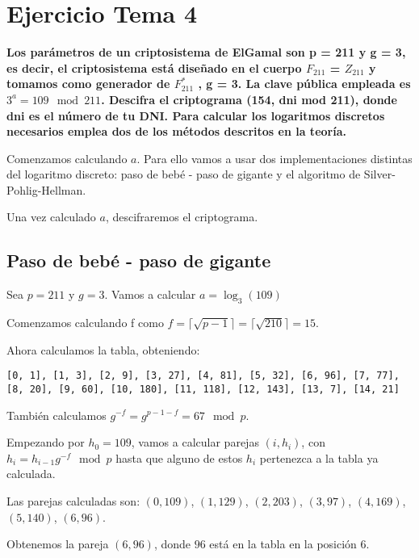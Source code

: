 \documentclass[a4paper]{article}
\title {\fbox{\Huge{\textbf{Ejercicio Tema 4}}}}
\author {\fbox{Ana Buendía Ruiz-Azuaga}}
\begin{document}
\maketitle


\section{Ejercicio Tema 4}

\textbf{Los parámetros de un criptosistema de ElGamal son p = 211 y g = 3, es decir, el criptosistema está diseñado en el cuerpo $F_{211}$ = $Z_{211}$ y tomamos como generador de $F^*_{211}$ , g = 3. La clave pública empleada es $3^a = 109 \mod 211$. Descifra el criptograma (154, dni mod 211), donde dni es el número de tu DNI. Para calcular los logaritmos discretos necesarios emplea dos de los métodos descritos en la teoría.}

Comenzamos calculando $a$. Para ello vamos a usar dos implementaciones distintas del logaritmo discreto: paso de bebé - paso de gigante y el algoritmo de Silver-Pohlig-Hellman.

Una vez calculado $a$, descifraremos el criptograma.

\subsection{Paso de bebé - paso de gigante}

Sea $p=211$ y $g=3$. Vamos a calcular $a=\log_3 (109)$

Comenzamos calculando f como $f=\lceil\sqrt{p-1}\rceil=\lceil\sqrt{210}\rceil=15$.

Ahora calculamos la tabla, obteniendo:

\begin{verbatim}
[0, 1], [1, 3], [2, 9], [3, 27], [4, 81], [5, 32], [6, 96], [7, 77], 
[8, 20], [9, 60], [10, 180], [11, 118], [12, 143], [13, 7], [14, 21]
\end{verbatim}

También calculamos $g^{-f}=g^{p-1-f}=67 \mod p$.

Empezando por $h_0=109$, vamos a calcular parejas $(i,h_i)$, con $h_i=h_{i-1}g^{-f}\mod p$ hasta que alguno de estos $h_i$ pertenezca a la tabla ya calculada.

Las parejas calculadas son: $(0,109)$, $(1,129)$, $(2,203)$, $(3,97)$, $(4,169)$, $(5,140)$, $(6,96)$.

Obtenemos la pareja $(6,96)$, donde $96$ está en la tabla en la posición $6$.
\end{document}
